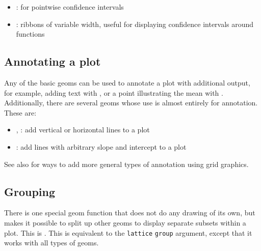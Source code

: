 \begin{itemize}
	\item {}: for pointwise confidence intervals
	\item {}: ribbons of variable width, useful for displaying confidence intervals around functions
\end{itemize}

\subsection{Annotating a plot}\label{sub:annotating_a_plot}

Any of the basic geoms can be used to annotate a plot with additional output, for example, adding text with , or a point illustrating the mean with .  Additionally, there are several geoms whose use is almost entirely for annotation.  These are:

\begin{itemize}
	\item {}, : add vertical or horizontal lines to a plot
	\item {}: add lines with arbitrary slope and intercept to a plot
\end{itemize}

See also  for ways to add more general types of annotation using grid graphics.

\subsection{Grouping}\label{sub:grouping}

There is one special geom function that does not do any drawing of its own, but makes it possible to split up other geoms to display separate subsets within a plot.  This is .  This is equivalent to the {\tt lattice} {\tt group} argument, except that it works with all types of geoms.  



